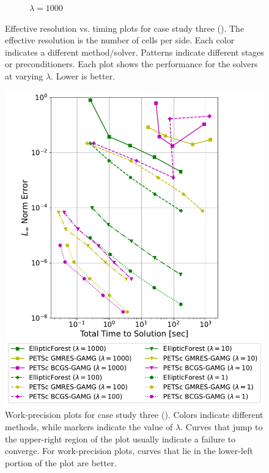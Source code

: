 \begin{figure}
\begin{subfigure}[t]{0.48\textwidth}
        \caption{$\lambda = 1000$}
    \end{subfigure}
    \caption{Effective resolution vs. timing plots for case study three (). The effective resolution is the number of cells per side. Each color indicates a different method/solver. Patterns indicate different stages or preconditioners. Each plot shows the performance for the solvers at varying $\lambda$. Lower is better.}
    \label{fig:case03-stacked-bar-plot}
\end{figure}

\begin{figure}
    \centering
    \includegraphics[width=1.0\textwidth, clip=true, trim={0 0 0 0}]{figures/case03-work-precision-plots-no-title.pdf}
    \caption{Work-precision plots for case study three (). Colors indicate different methods, while markers indicate the value of $\lambda$. Curves that jump to the upper-right region of the plot usually indicate a failure to converge. For work-precision plots, curves that lie in the lower-left portion of the plot are better.}
    \label{fig:case03-work-precision-plot}
\end{figure}

